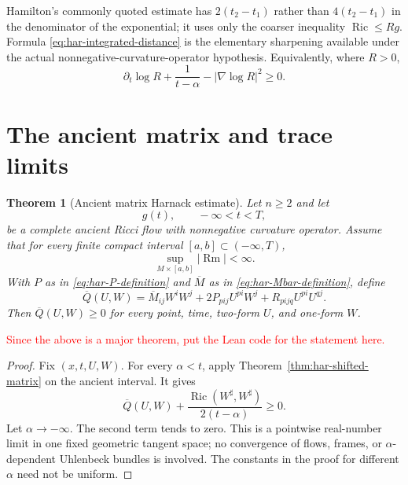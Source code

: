 \documentclass[10pt]{coll-l}
\newtheorem{theorem}{Theorem}[chapter]
\theoremstyle{definition}
\theoremstyle{remark}
\numberwithin{section}{chapter}
\numberwithin{equation}{chapter}
\newcommand{\Ric}{\operatorname{Ric}}
\newcommand{\Rm}{\operatorname{Rm}}
\begin{document}
Hamilton's commonly quoted estimate has $2(t_2-t_1)$ rather than
$4(t_2-t_1)$ in the denominator of the exponential; it uses only the
coarser inequality $\Ric\leq Rg$.  Formula
\eqref{eq:har-integrated-distance} is the elementary sharpening available
under the actual nonnegative-curvature-operator hypothesis.  Equivalently,
where $R>0$,
\begin{equation}
       \partial_t\log R+\frac1{t-\alpha}
                    -|\nabla\log R|^2\geq0.             \label{eq:har-log-scalar}
\end{equation}

\section{The ancient matrix and trace limits}
\label{sec:har-ancient}

\begin{theorem}[Ancient matrix Harnack estimate]
\label{thm:har-ancient-matrix}
Let $n\geq2$ and let
\[
                         g(t),\qquad -\infty<t<T,
\]
be a complete ancient Ricci flow with nonnegative curvature operator.
Assume that for every finite compact interval $[a,b]\subset(-\infty,T)$,
\begin{equation}
                       \sup_{M\times[a,b]}|\Rm|<\infty. \label{eq:har-ancient-slab}
\end{equation}
With $P$ as in \eqref{eq:har-P-definition} and $\overline M$ as in
\eqref{eq:har-Mbar-definition}, define
\begin{equation}
 \overline Q(U,W)=\overline M_{ij}W^iW^j
      +2P_{pij}U^{pi}W^j+R_{pijq}U^{pi}U^{qj}.           \label{eq:har-Q-ancient}
\end{equation}
Then $\overline Q(U,W)\geq0$ for every point, time, two-form $U$, and
one-form $W$.
\end{theorem}

\textcolor{red}{Since the above is a major theorem, put the Lean code for the statement here.}

\begin{proof}
Fix $(x,t,U,W)$.  For every $\alpha<t$, apply
Theorem~\ref{thm:har-shifted-matrix} on the ancient interval.  It gives
\[
 \overline Q(U,W)+\frac{\Ric(W^\sharp,W^\sharp)}{2(t-\alpha)}\geq0.
\]
Let $\alpha\to-\infty$.  The second term tends to zero.  This is a pointwise
real-number limit in one fixed geometric tangent space; no convergence of
flows, frames, or $\alpha$-dependent Uhlenbeck bundles is involved.  The
constants in the proof for different $\alpha$ need not be uniform.
\end{proof}
\end{document}
